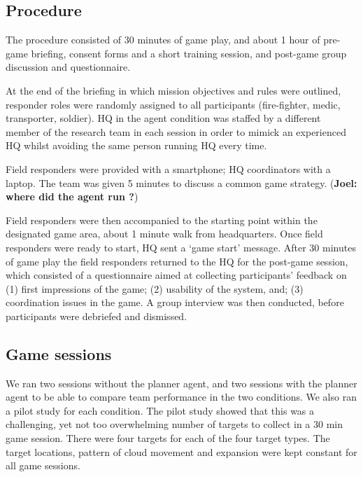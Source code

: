 \subsection{Procedure}
The procedure consisted of 30 minutes of game play, and about 1 hour of pre-game briefing, consent forms and a short training session, and post-game group discussion and questionnaire. 


At the end of the briefing in which mission objectives and rules were outlined, responder roles were randomly assigned to all participants (fire-fighter, medic, transporter, soldier). HQ in the agent condition was staffed by a different member of the research team in each session in order to mimick an experienced HQ whilst avoiding the same person running HQ every time. 

Field responders were provided with a smartphone; HQ coordinators with a laptop. The team was given 5 minutes to discuss a common game strategy. (\textbf{Joel: where did the agent run ?})

Field responders were then accompanied to the starting point within the designated game area, about 1 minute walk from headquarters. Once field responders were ready to start, HQ sent a `game start' message. After 30 minutes of game play the field responders returned to the HQ for the post-game session, which consisted of a questionnaire aimed at collecting participants' feedback on (1) first impressions of the game; (2) usability of the system, and; (3) coordination issues in the game. A group interview was then conducted, before participants were debriefed and dismissed.

\subsection{Game sessions}
We ran two sessions without the planner agent, and two sessions with the planner agent to be able to compare team performance in the two conditions. We also ran a pilot study for each condition. The pilot study showed that this was a challenging, yet not too overwhelming number of targets to collect in a 30 min game session. There were four targets for each of the four target types.
The target locations, pattern of cloud movement and expansion were kept constant for all game sessions. 

